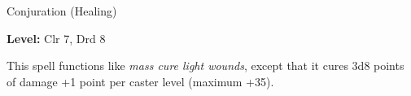 \label{spell:Mass Cure Serious Wounds}

Conjuration (Healing)

\textbf{Level:} Clr 7, Drd 8

This spell functions like \textit{mass cure light wounds}, except that it cures 
3d8 points of damage +1 point per caster level (maximum +35).

